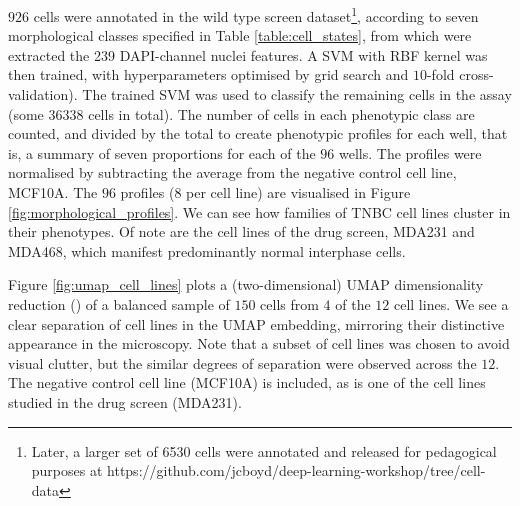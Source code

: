 $926$ cells were annotated in the wild type screen dataset\footnote{Later, a larger set of 6530 cells were annotated and released for pedagogical purposes at https://github.com/jcboyd/deep-learning-workshop/tree/cell-data}, according to seven morphological classes specified in Table \ref{table:cell_states}, from which were extracted the 239 DAPI-channel nuclei features. A SVM with RBF kernel was then trained, with hyperparameters optimised by grid search and $10$-fold cross-validation). The trained SVM was used to classify the remaining cells in the assay (some $36338$ cells in total). The number of cells in each phenotypic class are counted, and divided by the total to create phenotypic profiles for each well, that is, a summary of seven proportions for each of the $96$ wells. The profiles were normalised by subtracting the average from the negative control cell line, MCF10A. The $96$ profiles ($8$ per cell line) are visualised in Figure \ref{fig:morphological_profiles}. We can see how families of TNBC cell lines cluster in their phenotypes. Of note are the cell lines of the drug screen, MDA231 and MDA468, which manifest predominantly normal interphase cells.

Figure \ref{fig:umap_cell_lines} plots a (two-dimensional) UMAP dimensionality reduction (\cite{mcinnes2018umap}) of a balanced sample of $150$ cells from $4$ of the $12$ cell lines. We see a clear separation of cell lines in the UMAP embedding, mirroring their distinctive appearance in the microscopy. Note that a subset of cell lines was chosen to avoid visual clutter, but the similar degrees of separation were observed across the $12$. The negative control cell line (MCF10A) is included, as is one of the cell lines studied in the drug screen (MDA231).

